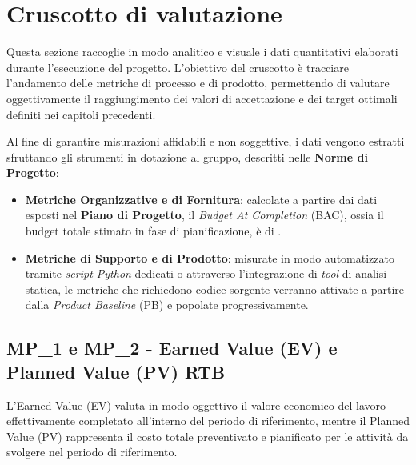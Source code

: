 \documentclass[12pt, a4paper]{article}
\begin{document}
\newpage
\section{Cruscotto di valutazione}
Questa sezione raccoglie in modo analitico e visuale i dati quantitativi elaborati durante l'esecuzione del progetto. L'obiettivo del cruscotto è tracciare l'andamento delle metriche di processo e di prodotto, permettendo di valutare oggettivamente il raggiungimento dei valori di accettazione e dei target ottimali definiti nei capitoli precedenti.

Al fine di garantire misurazioni affidabili e non soggettive, i dati vengono estratti sfruttando gli strumenti in dotazione al gruppo, descritti nelle \textbf{Norme di Progetto}:
\begin{itemize}
    \item \textbf{Metriche Organizzative e di Fornitura}: calcolate a partire dai dati esposti nel \textbf{Piano di Progetto}, il \textit{Budget At Completion} (BAC), ossia il budget totale stimato  in fase di pianificazione, è di .
    \item \textbf{Metriche di Supporto e di Prodotto}: misurate in modo automatizzato tramite \textit{ script Python} dedicati o attraverso l'integrazione di \textit{tool} di analisi statica, le metriche che richiedono codice sorgente verranno attivate a partire dalla \textit{Product Baseline} (PB) e popolate progressivamente.
\end{itemize}

\subsection{MP\_1 e MP\_2 - Earned Value (EV) e Planned Value (PV) RTB}
L'Earned Value (EV) valuta in modo oggettivo il valore economico del lavoro effettivamente completato all’interno del periodo di riferimento, mentre il Planned Value (PV) rappresenta il costo totale preventivato e pianificato per le attività da svolgere nel periodo di riferimento.
\end{document}
